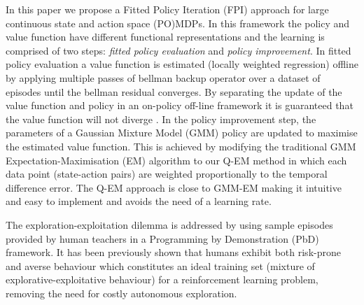 \documentclass[final,5p,times,twocolumn]{elsarticle}
\begin{document}
In this paper we propose a Fitted Policy Iteration (FPI) approach for large continuous state and action space 
(PO)MDPs. In this framework the policy and value function have different functional representations and the learning 
is comprised of two steps: \textit{fitted policy evaluation} and \textit{policy improvement}. In fitted policy 
evaluation a value function is estimated (locally weighted regression) offline by applying multiple passes of 
bellman backup operator over a dataset of episodes until the bellman residual converges. 
By separating the update of the value function and policy in an on-policy off-line framework 
it is guaranteed that the value function will not diverge \cite{stable_FA_gordon_1995,LSPI_2003} . In the policy improvement step, 
the parameters of a Gaussian Mixture Model (GMM) policy are updated to maximise the estimated value function. 
This is achieved by modifying the traditional GMM Expectation-Maximisation (EM) \cite{Bilmes97agentle} algorithm 
to our Q-EM method in which each data point (state-action pairs) are 
weighted proportionally to the temporal difference error. The Q-EM approach is close to GMM-EM making 
it intuitive and easy to implement and avoids the need of a learning rate.

The exploration-exploitation dilemma is addressed by using sample episodes provided by human 
teachers in a Programming by Demonstration (PbD) framework. It has been previously shown \cite{Chambrier2014} 
that humans exhibit both risk-prone and averse behaviour which constitutes an ideal training set 
(mixture of explorative-exploitative behaviour) for a reinforcement learning problem, removing the 
need for costly autonomous exploration. 

\end{document}
